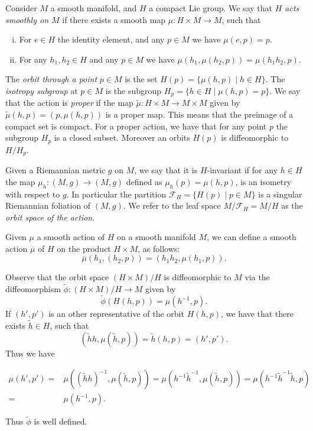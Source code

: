 \documentclass[12pt,a4paper,reqno]{amsart}
\newcommand{\1}{\mathbbm{1}} %
\newcommand{\fol}{\mathcal{F}} %
\theoremstyle{definition}
\theoremstyle{TheoremNum}
\begin{document}
Consider $M$ a  smooth manifold, and $H$ a compact Lie group. We say that \emph{$H$ acts smoothly on $M$} if there exists a smooth map $\mu\colon H\times M\to M$, such that
\begin{enumerate}[(i)]
    \item For $e\in H$ the identity element, and any $p\in M$ we have $\mu(e,p) = p$. 
    \item For any $h_1,h_2\in H$ and any $p\in M$ we have $\mu(h_1,\mu(h_2,p)) = \mu(h_1 h_2, p)$.
\end{enumerate}
The \emph{orbit through a point} $p\in M$ is the set $H(p) = \{\mu(h,p)\mid h\in H\}$. The \emph{isotropy subgroup} at $p\in M$ is the subgroup $H_p = \{h\in H\mid \mu(h,p) = p\}$. We say that the action is \emph{proper} if the map $\tilde{\mu}\colon H\times M\to M\times M$ given by $\tilde{\mu}(h,p) = (p,\mu(h,p))$ is a proper map. This means that the preimage of a compact set is compact. For a proper action, we have that for any point $p$ the subgroup $H_p$ is a closed subset. Moreover an orbits $H(p)$ is diffeomorphic to $H/H_p$.

Given a Riemannian metric $g$ on $M$, we say that it is $H$-invariant if for any $h\in H$ the map $\mu_h\colon (M,g) \to (M,g)$ defined as $\mu_h(p) = \mu(h,p)$, is an isometry with respect to $g$. In particular the partition $\fol_H = \{H(p)\mid p\in M\}$ is a singular Riemannian foliation of $(M,g)$. We refer to the leaf space $M/\fol_H = M/H$ as the \emph{orbit space of the action}. 

Given $\mu$ a smooth action of $H$ on a smooth manifold $M$, we can define a smooth action $\overline{\mu}$ of $H$ on the product $H\times M$, as follows:
\[
    \overline{\mu}(h_1,(h_2,p)) = (h_1 h_2,\mu(h_1,p)).
\]

Observe that the orbit space $(H\times M)/H$ is diffeomorphic to $M$ via the diffeomorphism $\tilde{\phi}\colon (H\times M)/H\to M$ given by 
\[
	\tilde{\phi}(H(h,p)) = \mu(h^{-1},p).
\]
If $(h',p')$ is an other representative of the orbit $H(h,p)$, we have that there exists $\tilde{h}\in H$, such that
\[
(\tilde{h}h,\mu(\tilde{h},p)) = \tilde{h}(h,p) = (h',p').
\]
Thus we have
\begin{linenomath}
\begin{align*}
	\mu (h',p') =& \mu((\tilde{h}h)^{-1},\mu(\tilde{h},p)) = \mu (h^{-1}\tilde{h}^{-1},\mu(\tilde{h},p)) = \mu(h^{-1}\tilde{h}^{-1}\tilde{h},p)\\
	 =& \mu(h^{-1},p).
\end{align*}
\end{linenomath}
Thus $\tilde{\phi}$ is well defined. 
\end{document}

